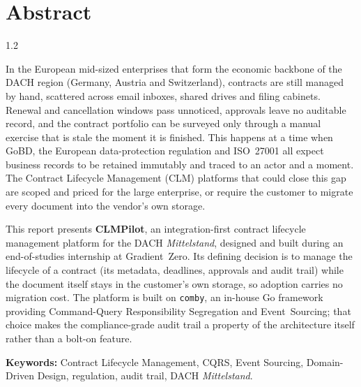 %

\chapter*{Abstract}
\begin{spacing}{1.2}

In the European mid-sized enterprises that form
the economic backbone of the DACH region (Germany, Austria and Switzerland), contracts are
still managed by hand, scattered across email inboxes, shared drives and
filing cabinets. Renewal and cancellation windows pass unnoticed, approvals
leave no auditable record, and the contract portfolio can be surveyed only
through a manual exercise that is stale the moment it is finished. This
happens at a time when GoBD, the European data-protection regulation and
ISO~27001 all expect business records to be retained immutably and traced to
an actor and a moment. The Contract Lifecycle Management (CLM) platforms that
could close this gap are scoped and priced for the large enterprise, or
require the customer to migrate every document into the vendor's own storage.

This report presents \textbf{CLMPilot}, an integration-first contract
lifecycle management platform for the DACH \textit{Mittelstand}, designed and
built during an end-of-studies internship at Gradient~Zero. Its defining
decision is to manage the lifecycle of a contract (its metadata, deadlines,
approvals and audit trail) while the document itself stays in the customer's
own storage, so adoption carries no migration cost. The platform is built on
\texttt{comby}, an in-house Go framework providing Command-Query
Responsibility Segregation and Event~Sourcing; that choice makes the
compliance-grade audit trail a property of the architecture itself rather
than a bolt-on feature.

\vspace{0.5cm}

\noindent\textbf{Keywords:} Contract Lifecycle Management, CQRS,
Event Sourcing, Domain-Driven Design, regulation, audit trail, DACH \textit{Mittelstand}.

\end{spacing}

